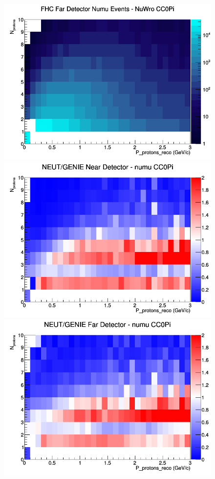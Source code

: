 \documentclass[12pt]{article}
\begin{document}
\begin{figure}[h]
\endminipage
{}
\includegraphics[width=\linewidth]{eff_N_P/GAr/protons/CC0Pi_FHC_FD_numu_N_P_NuWro.png}
\endminipage
\newline
{}
\includegraphics[width=\linewidth]{eff_N_P/GAr/protons/ratios/CC0Pi_NEUT_GENIE_numu_near_N_P.png}
\endminipage
{}
\includegraphics[width=\linewidth]{eff_N_P/GAr/protons/ratios/CC0Pi_NEUT_GENIE_numu_far_N_P.png}

\end{figure}
\end{document}
